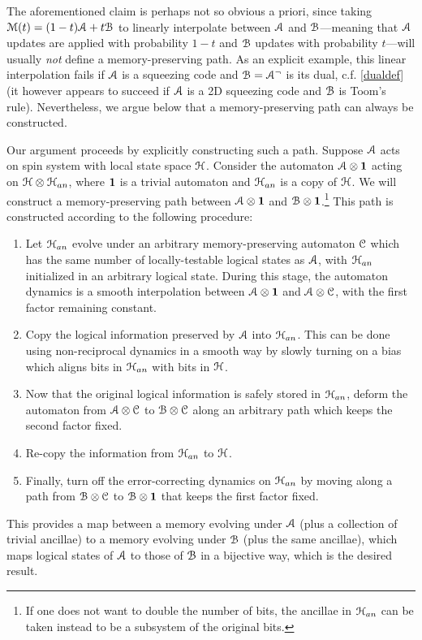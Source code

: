 \documentclass[pra,aps,twocolumn,groupedaddress,superscriptaddress,nofootinbib,preprintnumbers]{revtex4-2}
\begin{document}
\begin{widetext}
		The aforementioned claim is perhaps not so obvious a priori, since taking $\mathcal{M}(t) = (1-t) \mathcal{A} + t \mathcal{B}$ to linearly interpolate between $\mathcal{A}$ and $\mathcal{B}$---meaning that $\mathcal{A}$ updates are applied with probability $1-t$ and $\mathcal{B}$ updates with probability $t$---will usually {\it not} define a memory-preserving path. As an explicit example, this linear interpolation fails if $\mathcal{A}$ is a squeezing code and $\mathcal{B} = \mathcal{A}^\neg$ is its dual, c.f. \eqref{dualdef} (it however appears to succeed if $\mathcal{A}$ is a 2D squeezing code and $\mathcal{B}$ is Toom's rule). Nevertheless, we argue below that a memory-preserving path can always be constructed. 
		
		Our argument proceeds by explicitly constructing such a path. Suppose $\mathcal{A}$ acts on spin system with local state space $\mathcal{H}$. Consider the automaton $\mathcal{A} \otimes \mathbf{1}$ acting on $\mathcal{H} \otimes \mathcal{H}_{an}$, where $\mathbf{1}$ is a trivial automaton and $\mathcal{H}_{an}$ is a copy of $\mathcal{H}$. We will construct a memory-preserving path between $\mathcal{A} \otimes \mathbf{1}$ and $\mathcal{B} \otimes \mathbf{1}$.\footnote{If one does not want to double the number of bits, the ancillae in $\mathcal{H}_{an}$ can be taken instead to be a subsystem of the original bits.} This path is constructed according to the following procedure:
		\begin{enumerate}
			\item Let $\mathcal{H}_{an}$ evolve under an arbitrary memory-preserving automaton $\mathcal{C}$ which has the same number of locally-testable logical states as $\mathcal{A}$, with $\mathcal{H}_{an}$ initialized in an arbitrary logical state. During this stage, the automaton dynamics is a smooth interpolation between $\mathcal{A} \otimes \mathbf{1}$ and $\mathcal{A} \otimes \mathcal{C}$, with the first factor remaining constant. 
			\item Copy the logical information preserved by $\mathcal{A}$ into $\mathcal{H}_{an}$. This can be done using non-reciprocal dynamics in a smooth way by slowly turning on a bias which aligns bits in $\mathcal{H}_{an}$ with bits in $\mathcal{H}$.
			\item Now that the original logical information is safely stored in $\mathcal{H}_{an}$, deform the automaton from $\mathcal{A} \otimes \mathcal{C}$ to $\mathcal{B} \otimes \mathcal{C}$ along an arbitrary path which keeps the second factor fixed. 
			\item Re-copy the information from $\mathcal{H}_{an}$ to $\mathcal{H}$. 
			\item Finally, turn off the error-correcting dynamics on $\mathcal{H}_{an}$ by moving along a path from $\mathcal{B} \otimes \mathcal{C}$ to $\mathcal{B} \otimes \mathbf{1}$ that keeps the first factor fixed. 
		\end{enumerate}
		This provides a map between a memory evolving under $\mathcal{A}$ (plus a collection of trivial ancillae) to a memory evolving under $\mathcal{B}$ (plus the same ancillae), which maps logical states of $\mathcal{A}$ to those of $\mathcal{B}$ in a bijective way, which is the desired result. 
		
	\end{widetext} 

        
		
\end{document}
